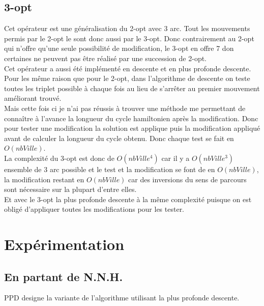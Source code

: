 \documentclass[12pt,a4paper]{article}
\begin{document}
\subsection{3-opt}
Cet opérateur est une généralisation du 2-opt avec 3 arc. Tout les mouvements permis par le 2-opt le sont donc aussi par le 3-opt. Donc contrairement au 2-opt qui n'offre qu'une seule possibilité de modification, le 3-opt en offre 7 don certaines ne peuvent pas être réalisé par une succession de 2-opt.\\

Cet opérateur a aussi été implémenté en descente et en plus profonde descente.\\
Pour les même raison que pour le 2-opt, dans l'algorithme de descente on teste toutes les triplet possible à chaque fois au lieu de s’arrêter au premier mouvement améliorant trouvé.\\
Mais cette fois ci je n'ai pas réussis à trouver une méthode me permettant de connaître à l'avance la longueur du cycle hamiltonien après la modification. Donc pour tester une modification la solution est applique puis la modification appliqué avant de calculer la longueur du cycle obtenu. Donc chaque test se fait en $O(nbVille)$.\\
La complexité du 3-opt est donc de $O(nbVille^4)$ car il y a $O(nbVille^3)$ ensemble de 3 arc possible et le test et la modification se font de en $O(nbVille)$, la modification restant en $O(nbVille)$ car des inversions du sens de parcours sont nécessaire sur la plupart d'entre elles.\\
Et avec le 3-opt la plus profonde descente à la même complexité puisque on est obligé d'appliquer toutes les modifications pour les tester.\\

\section{Expérimentation}
\subsection{En partant de N.N.H.}
PPD designe la variante de l'algorithme utilisant la plus profonde descente.\\
\end{document}
